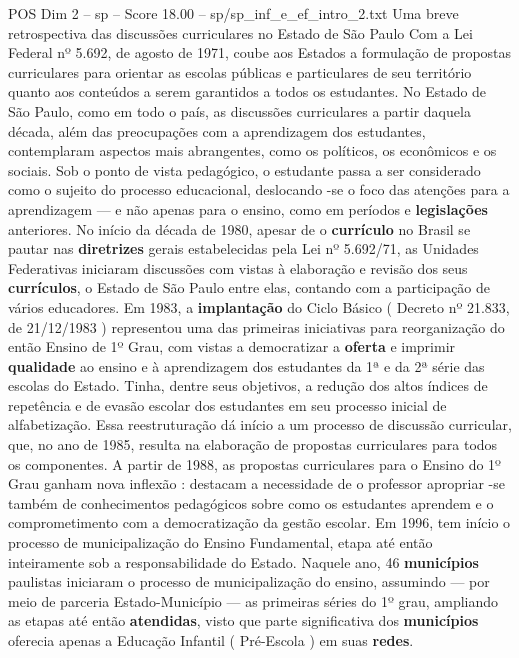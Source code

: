 \begin{textsample}{POS Dim 2 – sp – Score 18.00 – sp/sp\_inf\_e\_ef\_intro\_2.txt}  \label{ex:f2_pos_206}
Uma breve retrospectiva das discussões curriculares no Estado de São Paulo Com a Lei Federal nº 5.692, de agosto de 1971, coube aos Estados a formulação de propostas curriculares para orientar as escolas públicas e particulares de seu território quanto aos conteúdos a serem garantidos a todos os estudantes.
No Estado de São Paulo, como em todo o país, as discussões curriculares a partir daquela década, além das preocupações com a aprendizagem dos estudantes, contemplaram aspectos mais abrangentes, como os políticos, os econômicos e os sociais.
Sob o ponto de vista pedagógico, o estudante passa a ser considerado como o sujeito do processo educacional, deslocando -se o foco das atenções para a aprendizagem — e não apenas para o ensino, como em períodos e \textbf{legislações} anteriores.
No início da década de 1980, apesar de o \textbf{currículo} no Brasil se pautar nas \textbf{diretrizes} gerais estabelecidas pela Lei nº 5.692/71, as Unidades Federativas iniciaram discussões com vistas à elaboração e revisão dos seus \textbf{currículos}, o Estado de São Paulo entre elas, contando com a participação de vários educadores.
Em 1983, a \textbf{implantação} do Ciclo Básico ( Decreto nº 21.833, de 21/12/1983 ) representou uma das primeiras iniciativas para reorganização do então Ensino de 1º Grau, com vistas a democratizar a \textbf{oferta} e imprimir \textbf{qualidade} ao ensino e à aprendizagem dos estudantes da 1ª e da 2ª série das escolas do Estado.
Tinha, dentre seus objetivos, a redução dos altos índices de repetência e de evasão escolar dos estudantes em seu processo inicial de alfabetização.
Essa reestruturação dá início a um processo de discussão curricular, que, no ano de 1985, resulta na elaboração de propostas curriculares para todos os componentes.
A partir de 1988, as propostas curriculares para o Ensino do 1º Grau ganham nova inflexão : destacam a necessidade de o professor apropriar -se também de conhecimentos pedagógicos sobre como os estudantes aprendem e o comprometimento com a democratização da gestão escolar.
Em 1996, tem início o processo de municipalização do Ensino Fundamental, etapa até então inteiramente sob a responsabilidade do Estado.
Naquele ano, 46 \textbf{municípios} paulistas iniciaram o processo de municipalização do ensino, assumindo — por meio de parceria Estado-Município — as primeiras séries do 1º grau, ampliando as etapas até então \textbf{atendidas}, visto que parte significativa dos \textbf{municípios} oferecia apenas a Educação Infantil ( Pré-Escola ) em suas \textbf{redes}.

\end{textsample}
